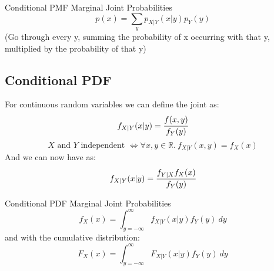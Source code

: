 \begin{definitionbox}{Conditional PMF Marginal Joint Probabilities}
	\[p(x) = \sum_yp_{X|Y}(x|y)p_Y(y)\]
	(Go through every y, summing the probability of x occurring with that y, multiplied by the probability of that y)
\end{definitionbox}
\subsection{Conditional PDF}
For continuous random variables we can define the joint  as:
\[f_{X|Y}(x|y) = \cfrac{f(x,y)}{f_Y(y)}\]
\[\text{$X$ and $Y$ independent } \Leftrightarrow \forall x,y \in \mathbb{R}. \ f_{X|Y}(x,y) = f_X(x)\]
And we can now have  as:
\[f_{X|Y}(x|y) = \cfrac{f_{Y|X} f_X(x)}{f_Y(y)}\]

\begin{definitionbox}{Conditional PDF Marginal Joint Probabilities}
	\[f_X(x) = \int_{y = -\infty}^{\infty} f_{X|Y}(x|y)f_Y(y) \ dy\]
	and with the cumulative distribution:
	\[F_X(x) = \int_{y = -\infty}^{\infty} F_{X|Y}(x|y)f_Y(y) \ dy\]
\end{definitionbox}

